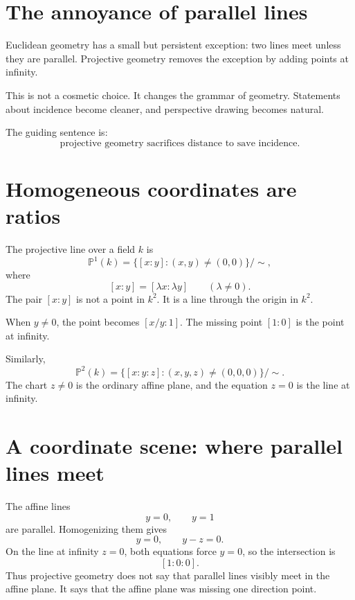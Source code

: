 
\section{The annoyance of parallel lines}

Euclidean geometry has a small but persistent exception: two lines meet unless they are parallel. Projective geometry removes the exception by adding points at infinity.

This is not a cosmetic choice. It changes the grammar of geometry. Statements about incidence become cleaner, and perspective drawing becomes natural.

The guiding sentence is:
\[
  \text{projective geometry sacrifices distance to save incidence.}
\]

\section{Homogeneous coordinates are ratios}

The projective line over a field \(k\) is
\[
  \mathbb P^1(k)=\{[x:y]:(x,y)\ne(0,0)\}/\sim,
\]
where
\[
  [x:y]=[\lambda x:\lambda y]\qquad(\lambda\ne0).
\]
The pair \([x:y]\) is not a point in \(k^2\). It is a line through the origin in \(k^2\).

When \(y\ne0\), the point becomes \([x/y:1]\). The missing point \([1:0]\) is the point at infinity.

Similarly,
\[
  \mathbb P^2(k)=\{[x:y:z]:(x,y,z)\ne(0,0,0)\}/\sim.
\]
The chart \(z\ne0\) is the ordinary affine plane, and the equation \(z=0\) is the line at infinity.

\section{A coordinate scene: where parallel lines meet}

The affine lines
\[
  y=0,
  \qquad
  y=1
\]
are parallel. Homogenizing them gives
\[
  y=0,
  \qquad
  y-z=0.
\]
On the line at infinity \(z=0\), both equations force \(y=0\), so the intersection is
\[
  [1:0:0].
\]
Thus projective geometry does not say that parallel lines visibly meet in the affine plane. It says that the affine plane was missing one direction point.

\begin{center}
\end{center}

